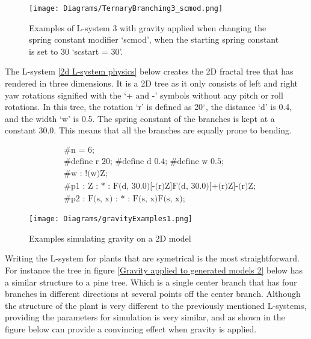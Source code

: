 \begin{figure}[htbp]
	{\centering
		\vspace{7px}
		\texttt{[image: Diagrams/TernaryBranching3\_scmod.png]}
		\caption{Examples of L-system 3 with gravity applied when changing the spring constant modifier `scmod', when the starting spring constant is set to 30 `scstart = 30'.}\label{increasing scmod}
	}
\end{figure}
\FloatBarrier

\noindent
The L-system \ref{2d L-system physics} below creates the 2D fractal tree that has rendered in three dimensions. It is a 2D tree as it only consists of left and right yaw rotations signified with the `+ and -' symbols without any pitch or roll rotations. In this tree, the rotation `r' is defined as 20$^{\circ}$, the distance `d' is 0.4, and the width `w' is 0.5. The spring constant of the branches is kept at a constant 30.0. This means that all the branches are equally prone to bending. 

\begin{singlespace}
\begin{equation} \label{2d L-system physics}
\begin{aligned}
	&\textrm{\#n = 6;} \\
	&\textrm{\#define r 20; \#define d 0.4; \#define w 0.5;}\\
	&\textrm{\#w : !(w)Z;}\\
	&\textrm{\#p1 : Z : * : F(d, 30.0)[-(r)Z]F(d, 30.0)[+(r)Z]-(r)Z;}\\
	&\textrm{\#p2 : F(s, x) : * : F(s, x)F(s, x);}
\end{aligned}
\end{equation}
\end{singlespace}

\begin{figure}[htbp]
	{\centering
		\vspace{7px}
		\texttt{[image: Diagrams/gravityExamples1.png]}
		\label{3DAxisFigure} \label{Gravity applied to generated models 1}
		\caption{Examples simulating gravity on a 2D model}
	}
\end{figure}
\FloatBarrier

\noindent
Writing the L-system for plants that are symetrical is the most straightforward. For instance the tree in figure \ref{Gravity applied to generated models 2} below has a similar structure to a pine tree. Which is a single center branch that has four branches in different directions at several points off the center branch. Although the structure of the plant is very different to the previously mentioned L-systems, providing the parameters for simulation is very similar, and as shown in the figure below can provide a convincing effect when gravity is applied.

